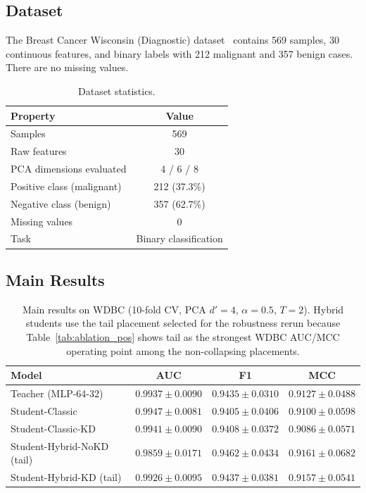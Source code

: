\documentclass[11pt,a4paper]{article}
\begin{document}
\subsection{Dataset}
The Breast Cancer Wisconsin (Diagnostic) dataset~\cite{wdbc} contains 569 samples, 30 continuous
features, and binary labels with 212 malignant and 357 benign cases. There are no missing values.

\begin{table}[t]
\caption{Dataset statistics.}
\label{tab:data}
\centering\small
\begin{tabular}{lc}
\toprule
Property & Value \\
\midrule
Samples & 569 \\
Raw features & 30 \\
PCA dimensions evaluated & 4 / 6 / 8 \\
Positive class (malignant) & 212 (37.3\%) \\
Negative class (benign) & 357 (62.7\%) \\
Missing values & 0 \\
Task & Binary classification \\
\bottomrule
\end{tabular}
\end{table}

\subsection{Main Results}

\begin{table}[t]
\caption{Main results on WDBC (10-fold CV, PCA $d'=4$, $\alpha=0.5$, $T=2$).
Hybrid students use the tail placement selected for the robustness rerun because
Table~\ref{tab:ablation_pos} shows tail as the strongest WDBC AUC/MCC operating point among the
non-collapsing placements.}
\label{tab:main}
\centering\small
\begin{tabular}{lccc}
\toprule
Model & AUC & F1 & MCC \\
\midrule
Teacher (MLP-64-32) & $0.9937 \pm 0.0090$ & $0.9435 \pm 0.0310$ & $0.9127 \pm 0.0488$ \\
\midrule
Student-Classic       & $0.9947 \pm 0.0081$ & $0.9405 \pm 0.0406$ & $0.9100 \pm 0.0598$ \\
Student-Classic-KD    & $0.9941 \pm 0.0090$ & $0.9408 \pm 0.0372$ & $0.9086 \pm 0.0571$ \\
Student-Hybrid-NoKD (tail) & $0.9859 \pm 0.0171$ & $0.9462 \pm 0.0434$ & $0.9161 \pm 0.0682$ \\
Student-Hybrid-KD (tail)   & $0.9926 \pm 0.0095$ & $0.9437 \pm 0.0381$ & $0.9157 \pm 0.0541$ \\
\bottomrule
\end{tabular}
\end{table}
\end{document}

